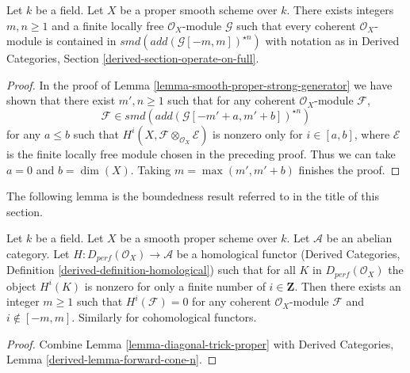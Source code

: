 \begin{lemma}
\label{lemma-diagonal-trick-proper}
Let $k$ be a field. Let $X$ be a proper smooth scheme over $k$.
There exists integers $m, n \geq 1$ and a finite locally free
$\mathcal{O}_X$-module $\mathcal{G}$ such that every coherent
$\mathcal{O}_X$-module is contained in $smd(add(\mathcal{G}[-m, m])^{\star n})$
with notation as in Derived Categories, Section
\ref{derived-section-operate-on-full}.
\end{lemma}

\begin{proof}
In the proof of Lemma \ref{lemma-smooth-proper-strong-generator}
we have shown that there exist $m', n \geq 1$ such that for any
coherent $\mathcal{O}_X$-module $\mathcal{F}$,
$$
\mathcal{F} \in smd(add(\mathcal{G}[-m' + a, m' + b])^{\star n})
$$
for any $a \leq b$ such that
$H^i(X, \mathcal{F} \otimes_{\mathcal{O}_X} \mathcal{E})$
is nonzero only for $i \in [a, b]$, where $\mathcal{E}$ is the
finite locally free module chosen in the preceding proof.
Thus we can take $a = 0$ and $b = \dim(X)$.
Taking $m = \max(m', m' + b)$ finishes the proof.
\end{proof}

\noindent
The following lemma is the boundedness result referred to
in the title of this section.

\begin{lemma}
\label{lemma-boundedness}
Let $k$ be a field. Let $X$ be a smooth proper scheme over $k$.
Let $\mathcal{A}$ be an abelian category. Let
$H : D_{perf}(\mathcal{O}_X) \to \mathcal{A}$ be a homological
functor (Derived Categories, Definition \ref{derived-definition-homological})
such that for all $K$ in $D_{perf}(\mathcal{O}_X)$ the object
$H^i(K)$ is nonzero for only a finite number of $i \in \mathbf{Z}$.
Then there exists an integer $m \geq 1$ such that
$H^i(\mathcal{F}) = 0$ for any coherent $\mathcal{O}_X$-module
$\mathcal{F}$ and $i \not \in [-m, m]$.
Similarly for cohomological functors.
\end{lemma}

\begin{proof}
Combine Lemma \ref{lemma-diagonal-trick-proper} with
Derived Categories, Lemma \ref{derived-lemma-forward-cone-n}.
\end{proof}

